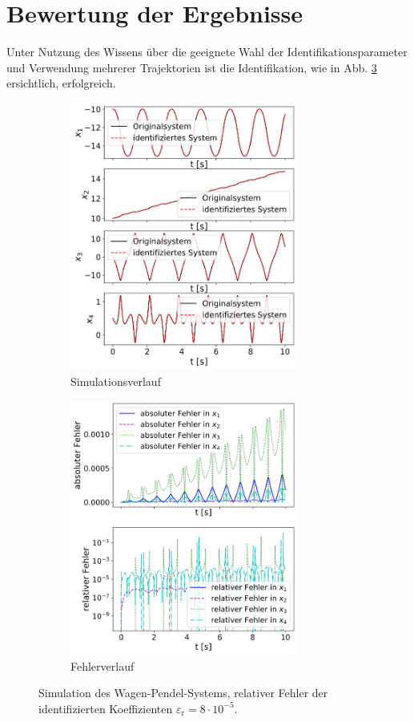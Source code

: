\section{Bewertung der Ergebnisse}
Unter Nutzung des Wissens über die geeignete Wahl der Identifikationsparameter und Verwendung mehrerer Trajektorien ist die Identifikation, wie in Abb. \ref{fig:sim_wp} ersichtlich, erfolgreich.
\begin{figure}[h!] %
	\centering
	\begin{subfigure}{.5\textwidth}
	  \centering
	  \includegraphics[width=75mm]{images/sim_wp_sim.png}
	  \caption{Simulationsverlauf}
	  \label{fig:sim_wp_sim}
	\end{subfigure}%
	\begin{subfigure}{.5\textwidth}
	  \centering
	  \includegraphics[width=75mm]{images/sim_wp_err.png}
	  \caption{Fehlerverlauf}
	  \label{fig:sim_wp_err}
	\end{subfigure}
	\caption{Simulation des Wagen-Pendel-Systems, relativer Fehler der identifizierten Koeffizienten $\varepsilon_\text{r} = 8\cdot 10^{-5}$.}
	\label{fig:sim_wp}
\end{figure}
